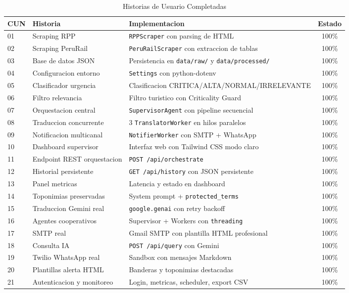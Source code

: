 \documentclass[10pt,twocolumn,a4paper]{article}
\begin{document}
\begin{table}[t]
\caption{Historias de Usuario Completadas}
\label{tab:historias}
\centering
\small
\begin{tabular}{p{1cm}p{3.8cm}p{5.5cm}c}
\toprule
\textbf{CUN} & \textbf{Historia} & \textbf{Implementacion} & \textbf{Estado} \\
\midrule
01 & Scraping RPP & \texttt{RPPScraper} con parsing de HTML & 100\% \\
02 & Scraping PeruRail & \texttt{PeruRailScraper} con extraccion de tablas & 100\% \\
03 & Base de datos JSON & Persistencia en \texttt{data/raw/} y \texttt{data/processed/} & 100\% \\
04 & Configuracion entorno & \texttt{Settings} con python-dotenv & 100\% \\
05 & Clasificador urgencia & Clasificacion CRITICA/ALTA/NORMAL/IRRELEVANTE & 100\% \\
06 & Filtro relevancia & Filtro turistico con Criticality Guard & 100\% \\
07 & Orquestacion central & \texttt{SupervisorAgent} con pipeline secuencial & 100\% \\
08 & Traduccion concurrente & 3 \texttt{TranslatorWorker} en hilos paralelos & 100\% \\
09 & Notificacion multicanal & \texttt{NotifierWorker} con SMTP + WhatsApp & 100\% \\
10 & Dashboard supervisor & Interfaz web con Tailwind CSS modo claro & 100\% \\
11 & Endpoint REST orquestacion & \texttt{POST /api/orchestrate} & 100\% \\
12 & Historial persistente & \texttt{GET /api/history} con JSON persistente & 100\% \\
13 & Panel metricas & Latencia y estado en dashboard & 100\% \\
14 & Toponimias preservadas & System prompt + \texttt{protected\_terms} & 100\% \\
15 & Traduccion Gemini real & \texttt{google.genai} con retry backoff & 100\% \\
16 & Agentes cooperativos & Supervisor + Workers con \texttt{threading} & 100\% \\
17 & SMTP real & Gmail SMTP con plantilla HTML profesional & 100\% \\
18 & Consulta IA & \texttt{POST /api/query} con Gemini & 100\% \\
19 & Twilio WhatsApp real & Sandbox con mensajes Markdown & 100\% \\
20 & Plantillas alerta HTML & Banderas y toponimias destacadas & 100\% \\
21 & Autenticacion y monitoreo & Login, metricas, scheduler, export CSV & 100\% \\
\bottomrule
\end{tabular}
\end{table}
\end{document}
